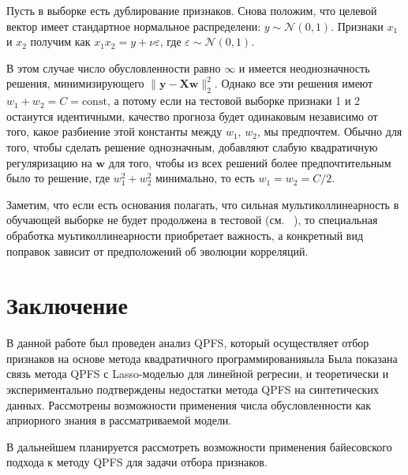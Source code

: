 \documentclass[12pt, twoside]{article}
\newcommand{\by}{\mathbf{y}}
\newcommand{\bw}{\mathbf{w}}
\newcommand{\bX}{\mathbf{X}}
\newcommand{\cN}{\mathcal{N}}
\begin{document}
Пусть в выборке есть дублирование признаков. Снова положим, что целевой вектор имеет стандартное нормальное распределени: $y \sim \cN(0, 1)$. Признаки $x_1$ и $x_2$ получим как $x_1 x_2 = y + \nu \varepsilon$, где $\varepsilon \sim \cN(0, 1)$.

В этом случае число обусловленности равно $\infty$ и имеется неоднозначность решения, минимизирующего $\|\by - \bX \bw\|_2^2$. Однако все эти решения имеют $w_1 + w_2 = C = \mathrm{const}$, а потому если на тестовой выборке признаки 1 и 2 останутся идентичными, качество прогноза будет одинаковым независимо от того, какое разбиение этой константы между $w_1$, $w_2$, мы предпочтем. Обычно для того, чтобы сделать решение однозначным, добавляют слабую квадратичную регуляризацию на $\bw$ для того, чтобы из всех решений более предпочтительным было то решение, где $w_1^2 + w_2^2$ минимально, то есть $w_1 = w_2 = C / 2$. 

Заметим, что если есть основания полагать, что сильная мультиколлинеарность в обучающей выборке не будет продолжена в тестовой (см. ~\cite{multicollinearity_need_no_continuation}), то специальная обработка муьтиколлинеарности приобретает важность, а конкретный вид поправок зависит от предположений об эволюции корреляций.


\section{Заключение}
В данной работе был проведен анализ QPFS, который осуществляет отбор признаков на основе метода квадратичного программированияыла Была показана связь метода QPFS с Lasso-моделью для линейной регресии, и теоретически и экспериментально подтверждены недостатки метода QPFS на синтетических данных. Рассмотрены возможности применения числа обусловленности как априорного знания в рассматриваемой модели.

В дальнейшем планируется рассмотреть возможности применения байесовского подхода к методу QPFS для задачи отбора признаков.




\nocite{*}
\end{document}
